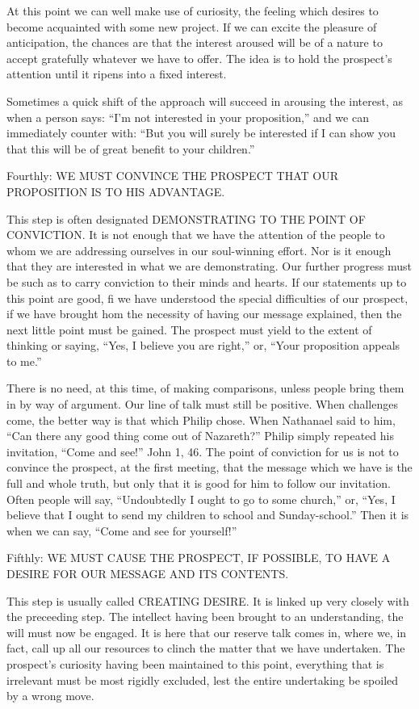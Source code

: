 \documentclass[
]{book}
\begin{document}
At this point we can well make use of curiosity, the feeling which desires to become acquainted with some new project. If we can excite the pleasure of anticipation, the chances are that the interest aroused will be of a nature to accept gratefully whatever we have to offer. The idea is to hold the prospect's attention until it ripens into a fixed interest.

Sometimes a quick shift of the approach will succeed in arousing the interest, as when a person says: ``I'm not interested in your proposition,'' and we can immediately counter with: ``But you will surely be interested if I can show you that this will be of great benefit to your children.''

Fourthly: WE MUST CONVINCE THE PROSPECT THAT OUR PROPOSITION IS TO HIS ADVANTAGE.

This step is often designated DEMONSTRATING TO THE POINT OF CONVICTION. It is not enough that we have the attention of the people to whom we are addressing ourselves in our soul-winning effort. Nor is it enough that they are interested in what we are demonstrating. Our further progress must be such as to carry conviction to their minds and hearts. If our statements up to this point are good, fi we have understood the special difficulties of our prospect, if we have brought hom the necessity of having our message explained, then the next little point must be gained. The prospect must yield to the extent of thinking or saying, ``Yes, I believe you are right,'' or, ``Your proposition appeals to me.''

There is no need, at this time, of making comparisons, unless people bring them in by way of argument. Our line of talk must still be positive. When challenges come, the better way is that which Philip chose. When Nathanael said to him, ``Can there any good thing come out of Nazareth?'' Philip simply repeated his invitation, ``Come and see!'' John 1, 46. The point of conviction for us is not to convince the prospect, at the first meeting, that the message which we have is the full and whole truth, but only that it is good for him to follow our invitation. Often people will say, ``Undoubtedly I ought to go to some church,'' or, ``Yes, I believe that I ought to send my children to school and Sunday-school.'' Then it is when we can say, ``Come and see for yourself!''

Fifthly: WE MUST CAUSE THE PROSPECT, IF POSSIBLE, TO HAVE A DESIRE FOR OUR MESSAGE AND ITS CONTENTS.

This step is usually called CREATING DESIRE. It is linked up very closely with the preceeding step. The intellect having been brought to an understanding, the will must now be engaged. It is here that our reserve talk comes in, where we, in fact, call up all our resources to clinch the matter that we have undertaken. The prospect's curiosity having been maintained to this point, everything that is irrelevant must be most rigidly excluded, lest the entire undertaking be spoiled by a wrong move.
\end{document}
